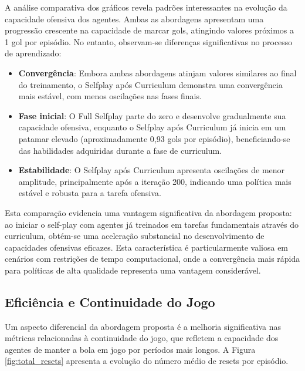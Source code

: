 A análise comparativa dos gráficos revela padrões interessantes na evolução da capacidade ofensiva dos agentes. Ambas as abordagens apresentam uma progressão crescente na capacidade de marcar gols, atingindo valores próximos a 1 gol por episódio. No entanto, observam-se diferenças significativas no processo de aprendizado:

\begin{itemize}
    \item \textbf{Convergência}: Embora ambas abordagens atinjam valores similares ao final do treinamento, o Selfplay após Curriculum demonstra uma convergência mais estável, com menos oscilações nas fases finais.
    
    \item \textbf{Fase inicial}: O Full Selfplay parte do zero e desenvolve gradualmente sua capacidade ofensiva, enquanto o Selfplay após Curriculum já inicia em um patamar elevado (aproximadamente 0,93 gols por episódio), beneficiando-se das habilidades adquiridas durante a fase de curriculum.
    
    \item \textbf{Estabilidade}: O Selfplay após Curriculum apresenta oscilações de menor amplitude, principalmente após a iteração 200, indicando uma política mais estável e robusta para a tarefa ofensiva.
\end{itemize}

Esta comparação evidencia uma vantagem significativa da abordagem proposta: ao iniciar o self-play com agentes já treinados em tarefas fundamentais através do curriculum, obtém-se uma aceleração substancial no desenvolvimento de capacidades ofensivas eficazes. Esta característica é particularmente valiosa em cenários com restrições de tempo computacional, onde a convergência mais rápida para políticas de alta qualidade representa uma vantagem considerável.

\subsection{Eficiência e Continuidade do Jogo}

Um aspecto diferencial da abordagem proposta é a melhoria significativa nas métricas relacionadas à continuidade do jogo, que refletem a capacidade dos agentes de manter a bola em jogo por períodos mais longos. A Figura \ref{fig:total_resets} apresenta a evolução do número médio de resets por episódio.

